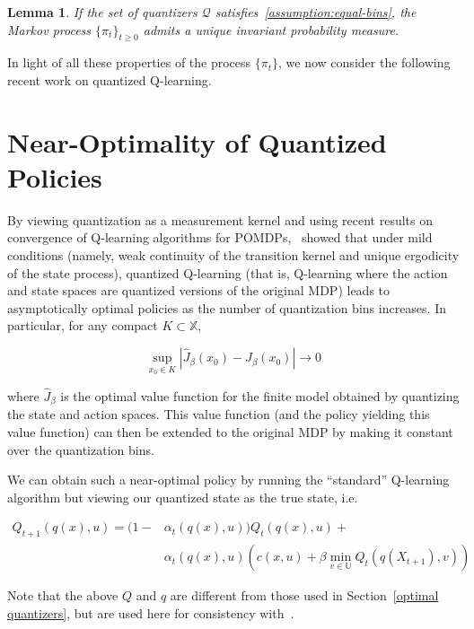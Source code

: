 \documentclass{article}
\newtheorem{lemma}[theorem]{Lemma}
\begin{document}
\begin{lemma}\label{lemma:invariant}
    If the set of quantizers \( \mathcal{Q} \) satisfies~\ref{assumption:equal-bins}, the Markov process \( \{\pi_t\}_{t\ge0} \) admits a unique invariant probability measure. %
\end{lemma}

In light of all these properties of the process \( \{\pi_t\} \), we now consider the following recent work on quantized Q-learning.

\section{Near-Optimality of Quantized Policies}
By viewing quantization as a measurement kernel and using recent results on convergence of Q-learning algorithms for POMDPs,~\cite{Kara} showed that under mild conditions (namely, weak continuity of the transition kernel and unique ergodicity of the state process), quantized Q-learning (that is, Q-learning where the action and state spaces are quantized versions of the original MDP) leads to asymptotically optimal policies as the number of quantization bins increases. In particular, for any compact \( K \subset \mathbb{X} \),

\[ \sup_{x_0 \in K}|\hat{J}_{\beta}(x_0) - J_{\beta}(x_0)| \to 0 \]

where \( \hat{J}_{\beta} \) is the optimal value function for the finite model obtained by quantizing the state and action spaces. This value function (and the policy yielding this value function) can then be extended to the original MDP by making it constant over the quantization bins.

We can obtain such a near-optimal policy by running the ``standard'' Q-learning algorithm but viewing our quantized state as the true state, i.e.

\begin{equation}
    \begin{split}
        Q_{t+1}(q(x),u) = (1- & \alpha_t(q(x),u))Q_t(q(x),u) + \\
        & \alpha_t(q(x),u)(c(x,u)+\beta \; \underset{v\in\mathbb{U}}{\text{min}} \; Q_t(q(X_{t+1}),v))\label{eq:2}
    \end{split}
\end{equation}

Note that the above \( Q \) and \( q \) are different from those used in Section~\ref{optimal quantizers}, but are used here for consistency with~\cite{Kara}.
\end{document}
